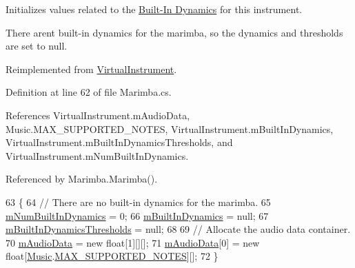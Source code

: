 Initializes values related to the \hyperlink{group___audio_DefBID}{Built-\/\+In Dynamics} for this instrument. 

There aren\textquotesingle{}t built-\/in dynamics for the marimba, so the dynamics and thresholds are set to null. 

Reimplemented from \hyperlink{group___v_i_base_virt_func_ga995456c03ee54543b285188c51c29a07}{Virtual\+Instrument}.



Definition at line 62 of file Marimba.\+cs.



References Virtual\+Instrument.\+m\+Audio\+Data, Music.\+M\+A\+X\+\_\+\+S\+U\+P\+P\+O\+R\+T\+E\+D\+\_\+\+N\+O\+T\+ES, Virtual\+Instrument.\+m\+Built\+In\+Dynamics, Virtual\+Instrument.\+m\+Built\+In\+Dynamics\+Thresholds, and Virtual\+Instrument.\+m\+Num\+Built\+In\+Dynamics.



Referenced by Marimba.\+Marimba().


\begin{DoxyCode}
63     \{
64         \textcolor{comment}{// There are no built-in dynamics for the marimba.}
65         \hyperlink{group___v_i_base_pro_var_gac265f64f759d267ee1e1680f8d387011}{mNumBuiltInDynamics} = 0;
66         \hyperlink{group___v_i_base_pro_var_ga87961e72f25fbc2256b614a394aa6f13}{mBuiltInDynamics} = null;
67         \hyperlink{group___v_i_base_pro_var_gae3db4264dc2a96e99ea680c6d637e6bf}{mBuiltInDynamicsThresholds} = null;
68 
69         \textcolor{comment}{// Allocate the audio data container.}
70         \hyperlink{group___v_i_base_pro_var_ga52e76d9b74408660584676035a92a2c6}{mAudioData} = \textcolor{keyword}{new} \textcolor{keywordtype}{float}[1][][];
71         \hyperlink{group___v_i_base_pro_var_ga52e76d9b74408660584676035a92a2c6}{mAudioData}[0] = \textcolor{keyword}{new} \textcolor{keywordtype}{float}[\hyperlink{class_music}{Music}.\hyperlink{group___music_constants_gaaf07da909a12e9fec0e43b70864f27b7}{MAX\_SUPPORTED\_NOTES}][];
72     \}
\end{DoxyCode}
